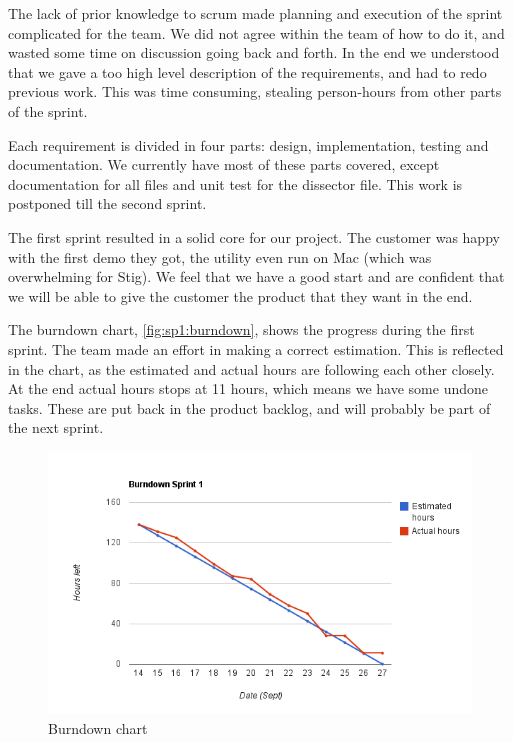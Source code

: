 The lack of prior knowledge to \Gls{scrum} made planning and execution of the sprint
complicated for the team. We did not agree within the team of how to do it, and
wasted some time on discussion going back and forth. In the end we understood
that we gave a too high level description of the requirements, and had to redo
previous work. This was time consuming, stealing person-hours from other parts
of the sprint.

Each requirement is divided in four parts: design, implementation, testing and
documentation. We currently have most of these parts covered, except
documentation for all files and unit test for the \gls{dissector} file. This work is
postponed till the second sprint.

The first sprint resulted in a solid core for our project. The customer was
happy with the first demo they got, the \gls{utility} even run on Mac (which was
overwhelming for Stig). We feel that we have a good start and are confident
that we will be able to give the customer the product that they want in the
end.

The burndown chart, \autoref{fig:sp1:burndown}, shows the progress during
the first sprint. The team made an effort in making a correct estimation. This
is reflected in the chart, as the estimated and actual hours are  following
each other closely. At the end actual hours stops at 11 hours, which means we
have some undone tasks. These are put back in the product backlog, and will
probably be part of the next sprint. 

\begin{figure}[!htb]
	\includegraphics[width=\textwidth]{./sprints/img/burndown_chart_s1}
	\caption{Burndown chart\label{fig:sp1:burndown}}
\end{figure}

